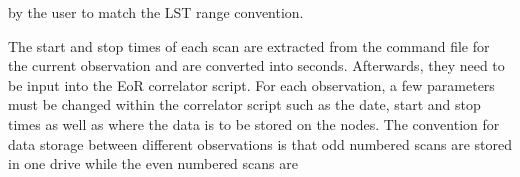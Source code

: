 \documentclass[a4paper,12pt]{article}
\begin{document}
by the user to match the LST range convention.

                                                                                                                                                                                                                                                                                                                                                                                                                                                                                                                                                                                                                                                                                                                                                                                                                                                                                                                                                                                                                                                                                                                                                                                                                                                                                                                                                                                                                                                                                                                                                                                                                                                                                                                                                                                                                                                                                                                                                                                                                                                                                                                                                                                                                                                                                                                                                                                                                                                                                                                                                                                                                                                                                                                                                                                                     The start and stop times of each scan are extracted from the command file for the current observation and are converted into seconds. Afterwards, they need to be input into the EoR correlator script. For each observation, a few parameters must be changed within the correlator script such as the date, start and stop times as well as where the data is to be stored on the nodes. The convention for data storage between different observations is that odd numbered scans are stored in one drive while the even numbered scans are 
\end{document}
